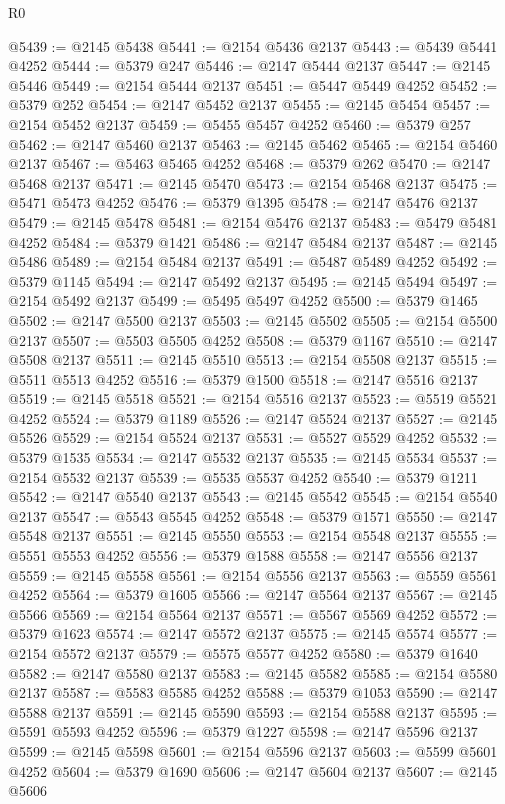 \begin{lexlean}{R0}
\begin{coremodule}
@5439 := @2145 @5438
@5441 := @2154 @5436 @2137
@5443 := @5439 @5441 @4252
@5444 := @5379 @247
@5446 := @2147 @5444 @2137
@5447 := @2145 @5446
@5449 := @2154 @5444 @2137
@5451 := @5447 @5449 @4252
@5452 := @5379 @252
@5454 := @2147 @5452 @2137
@5455 := @2145 @5454
@5457 := @2154 @5452 @2137
@5459 := @5455 @5457 @4252
@5460 := @5379 @257
@5462 := @2147 @5460 @2137
@5463 := @2145 @5462
@5465 := @2154 @5460 @2137
@5467 := @5463 @5465 @4252
@5468 := @5379 @262
@5470 := @2147 @5468 @2137
@5471 := @2145 @5470
@5473 := @2154 @5468 @2137
@5475 := @5471 @5473 @4252
@5476 := @5379 @1395
@5478 := @2147 @5476 @2137
@5479 := @2145 @5478
@5481 := @2154 @5476 @2137
@5483 := @5479 @5481 @4252
@5484 := @5379 @1421
@5486 := @2147 @5484 @2137
@5487 := @2145 @5486
@5489 := @2154 @5484 @2137
@5491 := @5487 @5489 @4252
@5492 := @5379 @1145
@5494 := @2147 @5492 @2137
@5495 := @2145 @5494
@5497 := @2154 @5492 @2137
@5499 := @5495 @5497 @4252
@5500 := @5379 @1465
@5502 := @2147 @5500 @2137
@5503 := @2145 @5502
@5505 := @2154 @5500 @2137
@5507 := @5503 @5505 @4252
@5508 := @5379 @1167
@5510 := @2147 @5508 @2137
@5511 := @2145 @5510
@5513 := @2154 @5508 @2137
@5515 := @5511 @5513 @4252
@5516 := @5379 @1500
@5518 := @2147 @5516 @2137
@5519 := @2145 @5518
@5521 := @2154 @5516 @2137
@5523 := @5519 @5521 @4252
@5524 := @5379 @1189
@5526 := @2147 @5524 @2137
@5527 := @2145 @5526
@5529 := @2154 @5524 @2137
@5531 := @5527 @5529 @4252
@5532 := @5379 @1535
@5534 := @2147 @5532 @2137
@5535 := @2145 @5534
@5537 := @2154 @5532 @2137
@5539 := @5535 @5537 @4252
@5540 := @5379 @1211
@5542 := @2147 @5540 @2137
@5543 := @2145 @5542
@5545 := @2154 @5540 @2137
@5547 := @5543 @5545 @4252
@5548 := @5379 @1571
@5550 := @2147 @5548 @2137
@5551 := @2145 @5550
@5553 := @2154 @5548 @2137
@5555 := @5551 @5553 @4252
@5556 := @5379 @1588
@5558 := @2147 @5556 @2137
@5559 := @2145 @5558
@5561 := @2154 @5556 @2137
@5563 := @5559 @5561 @4252
@5564 := @5379 @1605
@5566 := @2147 @5564 @2137
@5567 := @2145 @5566
@5569 := @2154 @5564 @2137
@5571 := @5567 @5569 @4252
@5572 := @5379 @1623
@5574 := @2147 @5572 @2137
@5575 := @2145 @5574
@5577 := @2154 @5572 @2137
@5579 := @5575 @5577 @4252
@5580 := @5379 @1640
@5582 := @2147 @5580 @2137
@5583 := @2145 @5582
@5585 := @2154 @5580 @2137
@5587 := @5583 @5585 @4252
@5588 := @5379 @1053
@5590 := @2147 @5588 @2137
@5591 := @2145 @5590
@5593 := @2154 @5588 @2137
@5595 := @5591 @5593 @4252
@5596 := @5379 @1227
@5598 := @2147 @5596 @2137
@5599 := @2145 @5598
@5601 := @2154 @5596 @2137
@5603 := @5599 @5601 @4252
@5604 := @5379 @1690
@5606 := @2147 @5604 @2137
@5607 := @2145 @5606

\end{coremodule}
\end{lexlean}
